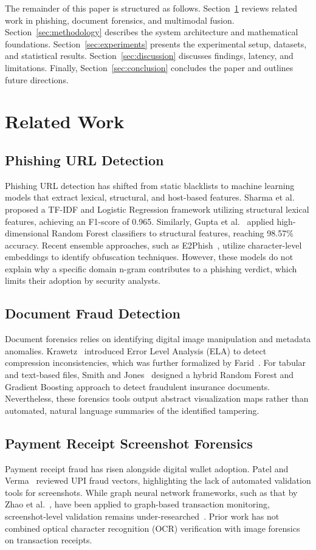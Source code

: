 \documentclass[journal]{IEEEtran}
\begin{document}
The remainder of this paper is structured as follows. Section~\ref{sec:related} reviews related work in phishing, document forensics, and multimodal fusion. Section~\ref{sec:methodology} describes the system architecture and mathematical foundations. Section~\ref{sec:experiments} presents the experimental setup, datasets, and statistical results. Section~\ref{sec:discussion} discusses findings, latency, and limitations. Finally, Section~\ref{sec:conclusion} concludes the paper and outlines future directions.

\section{Related Work}
\label{sec:related}

\subsection{Phishing URL Detection}
Phishing URL detection has shifted from static blacklists to machine learning models that extract lexical, structural, and host-based features. Sharma et al.~\cite{tfidf_lr_phish} proposed a TF-IDF and Logistic Regression framework utilizing structural lexical features, achieving an F1-score of 0.965. Similarly, Gupta et al.~\cite{rf_phish} applied high-dimensional Random Forest classifiers to structural features, reaching 98.57\% accuracy. Recent ensemble approaches, such as E2Phish~\cite{e2phish}, utilize character-level embeddings to identify obfuscation techniques. However, these models do not explain why a specific domain n-gram contributes to a phishing verdict, which limits their adoption by security analysts.

\subsection{Document Fraud Detection}
Document forensics relies on identifying digital image manipulation and metadata anomalies. Krawetz~\cite{ela_tamper} introduced Error Level Analysis (ELA) to detect compression inconsistencies, which was further formalized by Farid~\cite{ela_tamper_pdf}. For tabular and text-based files, Smith and Jones~\cite{rf_gbm_insurance} designed a hybrid Random Forest and Gradient Boosting approach to detect fraudulent insurance documents. Nevertheless, these forensics tools output abstract visualization maps rather than automated, natural language summaries of the identified tampering.

\subsection{Payment Receipt Screenshot Forensics}
Payment receipt fraud has risen alongside digital wallet adoption. Patel and Verma~\cite{upi_review} reviewed UPI fraud vectors, highlighting the lack of automated validation tools for screenshots. While graph neural network frameworks, such as that by Zhao et al.~\cite{gnn_xai_fraud}, have been applied to graph-based transaction monitoring, screenshot-level validation remains under-researched~\cite{upi2025survey}. Prior work has not combined optical character recognition (OCR) verification with image forensics on transaction receipts.
\end{document}
